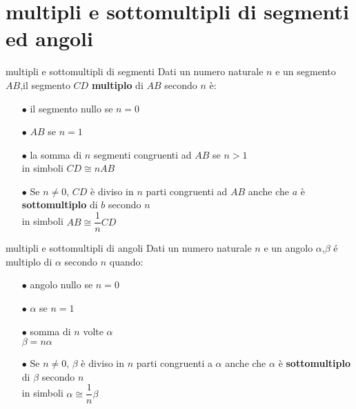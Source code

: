 \documentclass{beamer}
\begin{document}
\section{multipli e sottomultipli di segmenti ed angoli}
\begin{frame}{multipli e sottomultipli di segmenti}
    Dati un numero naturale $n$ e un segmento $AB$,il segmento $CD$ \textbf{multiplo} di $AB$ secondo $n$ è: 
    \begin{itemize}
\item[$\bullet$] il segmento nullo se $n=0$
        \item[$\bullet$] $AB$ se $n=1$
        \item[$\bullet$] la somma di $n$ segmenti congruenti ad $AB$ se $n>1$ \\
        in simboli $CD \cong nAB$
        \item[$\bullet$] Se $n \neq 0$, $CD$ è diviso in $n$ parti congruenti ad $AB$  anche che $a$ è \textbf{sottomultiplo} di $b$ secondo $n$ \\ 
        in simboli $AB \cong \dfrac{1}{n}CD$
    \end{itemize}
\end{frame}
\begin{frame}{multipli e sottomultipli di angoli}
    Dati un numero naturale $n$ e un angolo $\alpha$,$\beta$ é multiplo di $\alpha$ secondo $n$ quando:
\begin{itemize} 
\item[$\bullet$]angolo nullo se $n=0$
\item[$\bullet$] $\alpha$ se $n=1$
\item[$\bullet$] somma di $n$ volte $\alpha$ \\
    $\beta=n\alpha$
    \item[$\bullet$] Se $n \neq 0$, $\beta$ è diviso in $n$ parti congruenti a $\alpha$  anche che $\alpha$ è \textbf{sottomultiplo} di $\beta$ secondo $n$ \\ 
        in simboli $\alpha \cong \dfrac{1}{n}\beta$
\end{itemize}
\end{frame}
\end{document}
